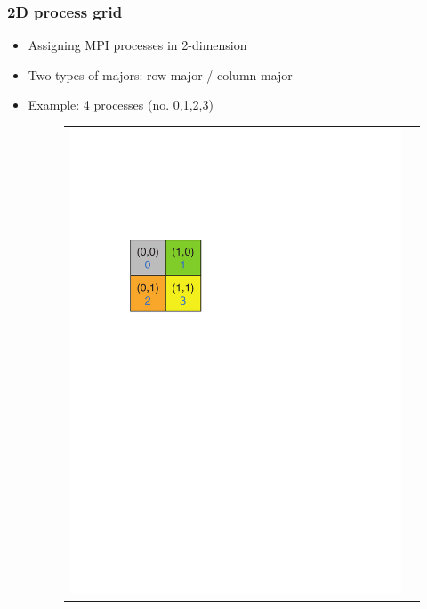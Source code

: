 \begin{frame}
  \frametitle{2D process grid}
  \begin{itemize}
  \item Assigning MPI processes in 2-dimension
  \item Two types of majors: row-major / column-major
  \item Example: 4 processes (no. {\color{blue}0,1,2,3})
  \begin{figure}[htbp]
\begin{tabular}{cc}
\begin{minipage}{0.4\hsize}
\begin{center}
\includegraphics[height=0.25\textheight]{figure/grid-row-major.pdf}

\end{center}
\end{minipage}
\end{tabular}
\end{figure}
\end{itemize}
\end{frame}
